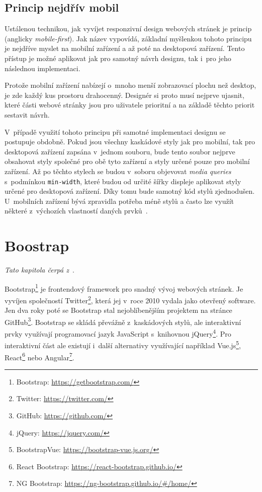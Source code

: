 \subsection{Princip nejdřív mobil}\label{section:mobile-first}
Ustálenou technikou, jak vyvíjet responzivní design webových stránek je princip  (anglicky \emph{mobile-first}). Jak název vypovídá, základní myšlenkou tohoto principu je nejdříve myslet na mobilní zařízení a až poté na desktopová zařízení. Tento přístup je možné aplikovat jak pro samotný návrh designu, tak i~pro jeho následnou implementaci.

Protože mobilní zařízení nabízejí o~mnoho menší zobrazovací plochu než desktop, je zde každý kus prostoru drahocenný. Designér si proto musí nejprve ujasnit, které části webové stránky jsou pro uživatele prioritní a na základě těchto priorit sestavit návrh.

V~případě využití tohoto principu při samotné implementaci designu se postupuje obdobně. Pokud jsou všechny kaskádové styly jak pro mobilní, tak pro desktopová zařízení zapsána v~jednom souboru, bude tento soubor nejprve obsahovat styly společné pro obě tyto zařízení a styly určené pouze pro mobilní zařízení. Až po těchto stylech se budou v~soboru objevovat \emph{media queries} s~podmínkou \texttt{min-width}, které budou od určité šířky displeje aplikovat styly určené pro desktopová zařízení. Díky tomu bude samotný kód stylů zjednodušen. U~mobilních zařízení bývá zpravidla potřeba méně stylů a často lze využít některé z~výchozích vlastností daných prvků~\cite{bib:mobile-first}.


\section{Boostrap}
\emph{Tato kapitola čerpá z~\cite{bib:bootstrap}}.

Bootstrap\footnote{Bootstrap: \url{https://getbootstrap.com/}} je frontendový framework pro snadný vývoj webových stránek. Je vyvíjen společností Twitter\footnote{Twitter: \url{https://twitter.com/}}, která jej v~roce 2010 vydala jako otevřený software. Jen dva roky poté se Bootstrap stal nejoblíbenějším projektem na stránce GitHub\footnote{GitHub: \url{https://github.com/}}. Bootstrap se skládá převážně z~kaskádových stylů, ale interaktivní prvky využívají programovací jazyk JavaScript s~knihovnou jQuery\footnote{jQuery: \url{https://jquery.com/}}. Pro interaktivní část ale existují i~další alternativy využívající například Vue.js\footnote{BootstrapVue: \url{https://bootstrap-vue.js.org/}}, React\footnote{React Bootstrap: \url{https://react-bootstrap.github.io/}} nebo Angular\footnote{NG Bootstrap: \url{https://ng-bootstrap.github.io/\#/home/}}.

